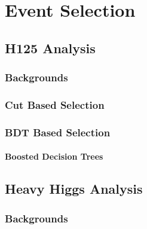 
%
%

\chapter{Event Selection}
\label{event_selection}


\section{H125 Analysis}
\label{h125_evt_selec}

\subsection{Backgrounds}
\label{h125_evt_sel_bkg}

\subsection{Cut Based Selection}
\label{h125_cb_sel}

\subsection{BDT Based Selection}
\label{h125_bdt_Sel}

\subsubsection{Boosted Decision Trees}
\label{bdts}


\section{Heavy Higgs Analysis}
\label{hh_evt_selec}

\subsection{Backgrounds}
\label{hh_evt_sel_bkg}









%
% 
% 
